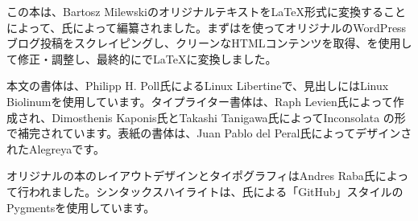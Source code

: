 \lettrine[lraise=-0.03,loversize=0.08]{こ}{の本}は、Bartosz Milewskiのオリジナルテキストを\LaTeX{}形式に変換することによって、氏によって編纂されました。まずはを使ってオリジナルのWordPressブログ投稿をスクレイピングし、クリーンなHTMLコンテンツを取得、を使用して修正・調整し、最終的にで\LaTeX{}に変換しました。

本文の書体は、Philipp H. Poll氏によるLinux Libertineで、見出しにはLinux Biolinumを使用しています。タイプライター書体は、Raph Levien氏によって作成され、Dimosthenis Kaponis氏とTakashi Tanigawa氏によってInconsolata の形で補完されています。表紙の書体は、Juan Pablo del Peral氏によってデザインされたAlegreyaです。

オリジナルの本のレイアウトデザインとタイポグラフィはAndres Raba氏によって行われました。シンタックスハイライトは、氏による「GitHub」スタイルのPygmentsを使用しています。
\ifdefined\OPTCustomLanguage{%
    
  }
\fi
